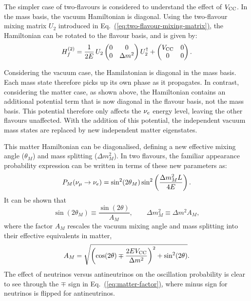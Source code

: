 The simpler case of two-flavours is considered to understand the effect of $V_{\rm CC}$. In the mass basis, the vacuum Hamiltonian is diagonal. Using the two-flavour mixing matrix $U_2$ introduced in
Eq.~\hyperref[eq:two-flavour-mixing-matrix]{(\ref{eq:two-flavour-mixing-matrix})},
the Hamiltonian can be rotated to the flavour basis, and is given by:
\begin{equation}
    H_f^{(2)} =
    \frac{1}{2E}\,U_2
    \begin{pmatrix} 0 & 0 \\ 0 & \Delta m^2 \end{pmatrix}
    U_2^{\dagger}
    +
    \begin{pmatrix} V_{\rm CC} & 0 \\ 0 & 0 \end{pmatrix}.
    \label{eq:matter-hamiltonian}
\end{equation}

Considering the vacuum case, the Hamilatonian is diagonal in the mass basis. Each mass state therefore picks up its own phase as it propagates. In contrast, considering the matter case, as shown above, the Hamiltonian contains an additional potential term that is now diagonal in the flavour basis, not the mass basis. This potential therefore only affects the $\nu_e$ energy level, leaving the other flavours unaffected. 
With the addition of this potential, the independent vacuum mass states are replaced by new independent matter eigenstates.

This matter Hamiltonian can be diagonalised, defining a new effective mixing angle ($\theta_M$) and mass splitting ($\Delta m_M^2$). In two flavours, the familiar appearance probability expression can be written in terms of these new parameters as:
\begin{equation}
    P_M(\nu_\mu\to\nu_e) = \sin^2(2\theta_M) \sin^2\left(\frac{\Delta m_M^2L}{4E}\right).
    \label{eq:two-flavour-matter-probability}
\end{equation}
It can be shown that~\cite{Booth2021}
\begin{equation}
    \sin(2\theta_M) \equiv \frac{\sin(2\theta)}{A_M},
    \qquad
    \Delta m_M^2 \equiv \Delta m^2 A_M,
    \label{eq:matter-effective-params}
\end{equation}
where the factor $A_M$ rescales the vacuum mixing angle and mass splitting into their effective equivalents in matter,
\begin{equation}
    A_M = \sqrt{\left(\cos(2\theta)\mp\frac{2EV_{\rm CC}}{\Delta m^2}\right)^2 + \sin^2(2\theta)}.
    \label{eq:matter-factor}
\end{equation}
The effect of neutrinos versus antineutrinos on the oscillation probability is clear to see through the $\mp$ sign in Eq.~\hyperref[eq:matter-factor]{(\ref{eq:matter-factor})}, where minus sign for neutrinos is flipped for antineutrinos.

